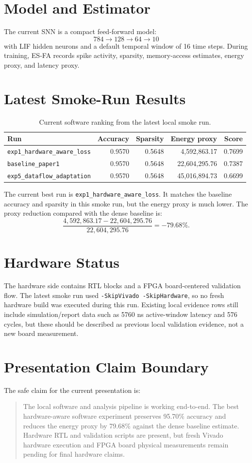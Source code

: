 \documentclass[11pt]{article}
\begin{document}
\section{Model and Estimator}
The current SNN is a compact feed-forward model:
\[
784 \rightarrow 128 \rightarrow 64 \rightarrow 10
\]
with LIF hidden neurons and a default temporal window of 16 time steps. During
training, ES-FA records spike activity, sparsity, memory-access estimates, energy
proxy, and latency proxy.

\section{Latest Smoke-Run Results}
\begin{table}[h]
\centering
\begin{tabular}{lrrrr}
\toprule
Run & Accuracy & Sparsity & Energy proxy & Score \\
\midrule
\texttt{exp1\_hardware\_aware\_loss} & 0.9570 & 0.5648 & 4,592,863.17 & 0.7699 \\
\texttt{baseline\_paper1} & 0.9570 & 0.5648 & 22,604,295.76 & 0.7387 \\
\texttt{exp5\_dataflow\_adaptation} & 0.9570 & 0.5648 & 45,016,894.73 & 0.6699 \\
\bottomrule
\end{tabular}
\caption{Current software ranking from the latest local smoke run.}
\end{table}

The current best run is \texttt{exp1\_hardware\_aware\_loss}. It matches the
baseline accuracy and sparsity in this smoke run, but the energy proxy is much
lower. The proxy reduction compared with the dense baseline is:
\[
\frac{4{,}592{,}863.17 - 22{,}604{,}295.76}{22{,}604{,}295.76}
= -79.68\%.
\]

\section{Hardware Status}
The hardware side contains RTL blocks and a FPGA board-centered validation flow. The
latest smoke run used \texttt{-SkipVivado -SkipHardware}, so no fresh hardware
build was executed during this run. Existing local evidence rows still include
simulation/report data such as 5760 ns active-window latency and 576 cycles, but
these should be described as previous local validation evidence, not a new board
measurement.

\section{Presentation Claim Boundary}
The safe claim for the current presentation is:
\begin{quote}
The local software and analysis pipeline is working end-to-end. The best
hardware-aware software experiment preserves 95.70\% accuracy and reduces the
energy proxy by 79.68\% against the dense baseline estimate. Hardware RTL and
validation scripts are present, but fresh Vivado hardware execution and FPGA board
physical measurements remain pending for final hardware claims.
\end{quote}
\end{document}
